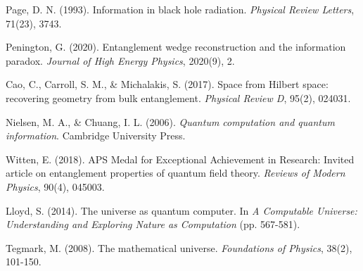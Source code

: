 \documentclass[12pt,a4paper]{article}
\begin{document}
\begin{thebibliography}{99}
 Page, D. N. (1993). Information in black hole radiation. \textit{Physical Review Letters}, 71(23), 3743.

 Penington, G. (2020). Entanglement wedge reconstruction and the information paradox. \textit{Journal of High Energy Physics}, 2020(9), 2.

 Cao, C., Carroll, S. M., \& Michalakis, S. (2017). Space from Hilbert space: recovering geometry from bulk entanglement. \textit{Physical Review D}, 95(2), 024031.

 Nielsen, M. A., \& Chuang, I. L. (2006). \textit{Quantum computation and quantum information}. Cambridge University Press.

 Witten, E. (2018). APS Medal for Exceptional Achievement in Research: Invited article on entanglement properties of quantum field theory. \textit{Reviews of Modern Physics}, 90(4), 045003.

 Lloyd, S. (2014). The universe as quantum computer. In \textit{A Computable Universe: Understanding and Exploring Nature as Computation} (pp. 567-581).

 Tegmark, M. (2008). The mathematical universe. \textit{Foundations of Physics}, 38(2), 101-150.

\end{thebibliography}
\end{document}

